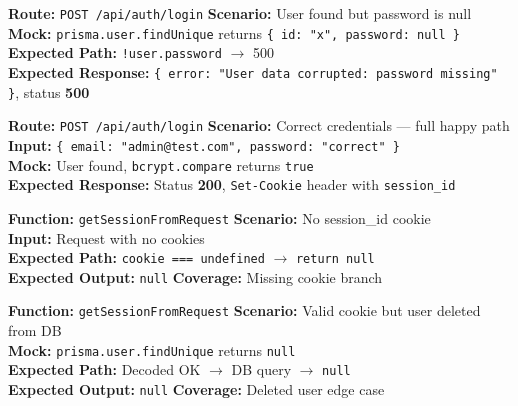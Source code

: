 ﻿\documentclass[12pt,a4paper]{report}
\newcommand{\pone}{\textbf{\color{p1red}P1}}
\newcommand{\ptwo}{\textbf{\color{p2orange}P2}}
\begin{document}
\begin{tcolorbox}[criticalbox,title={AUTH-013 \hfill \ptwo\ --- Corrupted Data}]
\textbf{Route:} \texttt{POST /api/auth/login} \quad \textbf{Scenario:} User found but password is null \\
\textbf{Mock:} \texttt{prisma.user.findUnique} returns \texttt{\{ id: "x", password: null \}} \\
\textbf{Expected Path:} \texttt{!user.password} $\to$ 500 \\
\textbf{Expected Response:} \texttt{\{ error: "User data corrupted: password missing" \}}, status \textbf{500}
\end{tcolorbox}

\begin{tcolorbox}[testbox,title={AUTH-014 \hfill \pone}]
\textbf{Route:} \texttt{POST /api/auth/login} \quad \textbf{Scenario:} Correct credentials --- full happy path \\
\textbf{Input:} \texttt{\{ email: "admin@test.com", password: "correct" \}} \\
\textbf{Mock:} User found, \texttt{bcrypt.compare} returns \texttt{true} \\
\textbf{Expected Response:} Status \textbf{200}, \texttt{Set-Cookie} header with \texttt{session\_id}
\end{tcolorbox}

\begin{tcolorbox}[testbox,title={AUTH-015 \hfill \pone}]
\textbf{Function:} \texttt{getSessionFromRequest} \quad \textbf{Scenario:} No session\_id cookie \\
\textbf{Input:} Request with no cookies \\
\textbf{Expected Path:} \texttt{cookie === undefined} $\to$ \texttt{return null} \\
\textbf{Expected Output:} \texttt{null} \quad \textbf{Coverage:} Missing cookie branch
\end{tcolorbox}

\begin{tcolorbox}[testbox,title={AUTH-016 \hfill \ptwo}]
\textbf{Function:} \texttt{getSessionFromRequest} \quad \textbf{Scenario:} Valid cookie but user deleted from DB \\
\textbf{Mock:} \texttt{prisma.user.findUnique} returns \texttt{null} \\
\textbf{Expected Path:} Decoded OK $\to$ DB query $\to$ \texttt{null} \\
\textbf{Expected Output:} \texttt{null} \quad \textbf{Coverage:} Deleted user edge case
\end{tcolorbox}
\end{document}
